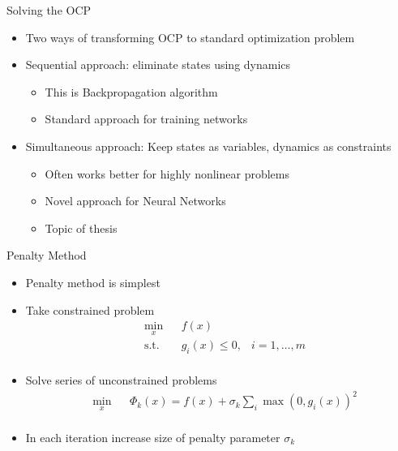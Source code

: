 \documentclass[11pt,t]{beamer}
\begin{document}
\begin{frame}{Solving the OCP}
   \begin{itemize}
   \itemsep 10pt
   \item Two ways of transforming OCP to standard optimization problem
   \item Sequential approach: eliminate states using dynamics
   \begin{itemize}
      \vspace{5pt}
      \itemsep 5pt
      \item This is Backpropagation algorithm
      \item Standard approach for training networks
   \end{itemize}
   \item Simultaneous approach: Keep states as variables, dynamics as constraints
   \begin{itemize}
      \vspace{5pt}
      \itemsep 5pt
      \item Often works better for highly nonlinear problems
      \item Novel approach for Neural Networks
      \item Topic of thesis
   \end{itemize}
   \end{itemize}
\end{frame}

\begin{frame}{Penalty Method}
   \begin{itemize}
      \item Penalty method is simplest
      \item Take constrained problem
      \begin{equation*}
      \begin{aligned}
      & \underset{x}{\text{min}}
      & & f(x) \\
      & \text{s.t.}
      & & g_i(x) \leq 0, & i = 1,\ldots,m \\
      \end{aligned}
      \end{equation*}
      \item Solve series of unconstrained problems
      \begin{equation*}
      \begin{aligned}
      & \underset{x}{\text{min}} 
      & & \Phi_k(x) = f(x) + \sigma_k \sum\limits_{i} \max(0,g_i(x))^2   \\
      \end{aligned}
      \end{equation*}
      \item In each iteration increase size of penalty parameter $\sigma_k$
   \end{itemize}
\end{frame}
\end{document}
